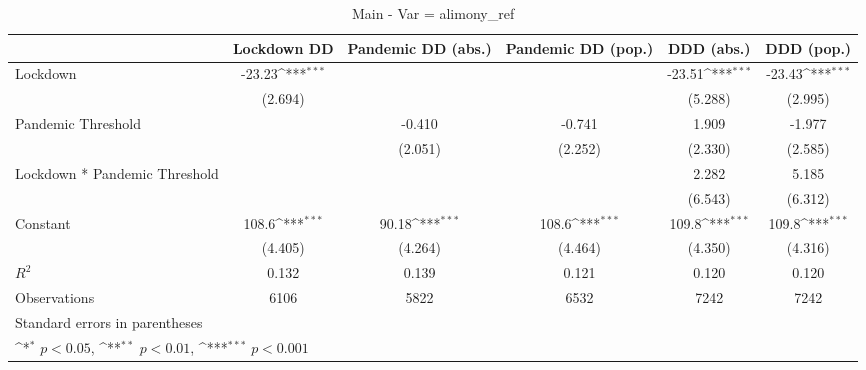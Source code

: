\documentclass{article}
\begin{document}
{
\def\sym#1{\ifmmode^{#1}\else\(^{#1}\)\fi}
\begin{longtable}{l*{5}{c}}
\caption{Main - Var = alimony\_ref}\\
\hline\hline\endfirsthead\hline\endhead\hline\endfoot\endlastfoot
                &\multicolumn{1}{c}{Lockdown DD}&\multicolumn{1}{c}{Pandemic DD (abs.)}&\multicolumn{1}{c}{Pandemic DD (pop.)}&\multicolumn{1}{c}{DDD (abs.)}&\multicolumn{1}{c}{DDD (pop.)}\\
\hline
Lockdown        &   -23.23\sym{***}&                  &                  &   -23.51\sym{***}&   -23.43\sym{***}\\
                &  (2.694)         &                  &                  &  (5.288)         &  (2.995)         \\
Pandemic Threshold&                  &   -0.410         &   -0.741         &    1.909         &   -1.977         \\
                &                  &  (2.051)         &  (2.252)         &  (2.330)         &  (2.585)         \\
Lockdown * Pandemic Threshold&                  &                  &                  &    2.282         &    5.185         \\
                &                  &                  &                  &  (6.543)         &  (6.312)         \\
Constant        &    108.6\sym{***}&    90.18\sym{***}&    108.6\sym{***}&    109.8\sym{***}&    109.8\sym{***}\\
                &  (4.405)         &  (4.264)         &  (4.464)         &  (4.350)         &  (4.316)         \\
\hline
\(R^{2}\)       &    0.132         &    0.139         &    0.121         &    0.120         &    0.120         \\
Observations    &     6106         &     5822         &     6532         &     7242         &     7242         \\
\hline\hline
\multicolumn{6}{l}{\footnotesize Standard errors in parentheses}\\
\multicolumn{6}{l}{\footnotesize \sym{*} \(p<0.05\), \sym{**} \(p<0.01\), \sym{***} \(p<0.001\)}\\
\end{longtable}
}
\end{document}
